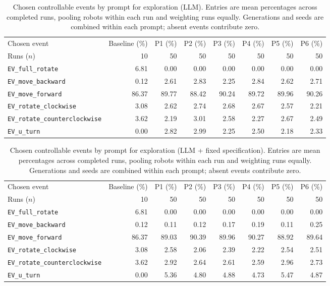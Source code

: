 \begin{table}[htbp]
\centering
\small
\caption{Chosen controllable events by prompt for exploration (LLM). Entries are mean percentages across completed runs, pooling robots within each run and weighting runs equally. Generations and seeds are combined within each prompt; absent events contribute zero.}
\label{tab:exploration-without-fixed-spec-prompt-events}
\begin{tabular}{lrrrrrrr}
\hline
Chosen event & Baseline (\%) & P1 (\%) & P2 (\%) & P3 (\%) & P4 (\%) & P5 (\%) & P6 (\%) \\
Runs ($n$) & 10 & 50 & 50 & 50 & 50 & 50 & 50 \\
\hline
\texttt{EV\_full\_rotate} & 6.81 & 0.00 & 0.00 & 0.00 & 0.00 & 0.00 & 0.00 \\
\texttt{EV\_move\_backward} & 0.12 & 2.61 & 2.83 & 2.25 & 2.84 & 2.62 & 2.71 \\
\texttt{EV\_move\_forward} & 86.37 & 89.77 & 88.42 & 90.24 & 89.72 & 89.96 & 90.26 \\
\texttt{EV\_rotate\_clockwise} & 3.08 & 2.62 & 2.74 & 2.68 & 2.67 & 2.57 & 2.21 \\
\texttt{EV\_rotate\_counterclockwise} & 3.62 & 2.19 & 3.01 & 2.58 & 2.27 & 2.67 & 2.49 \\
\texttt{EV\_u\_turn} & 0.00 & 2.82 & 2.99 & 2.25 & 2.50 & 2.18 & 2.33 \\
\hline
\end{tabular}
\end{table}

\begin{table}[htbp]
\centering
\small
\caption{Chosen controllable events by prompt for exploration (LLM + fixed specification). Entries are mean percentages across completed runs, pooling robots within each run and weighting runs equally. Generations and seeds are combined within each prompt; absent events contribute zero.}
\label{tab:exploration-with-fixed-spec-prompt-events}
\begin{tabular}{lrrrrrrr}
\hline
Chosen event & Baseline (\%) & P1 (\%) & P2 (\%) & P3 (\%) & P4 (\%) & P5 (\%) & P6 (\%) \\
Runs ($n$) & 10 & 50 & 50 & 50 & 50 & 50 & 50 \\
\hline
\texttt{EV\_full\_rotate} & 6.81 & 0.00 & 0.00 & 0.00 & 0.00 & 0.00 & 0.00 \\
\texttt{EV\_move\_backward} & 0.12 & 0.11 & 0.12 & 0.17 & 0.19 & 0.11 & 0.25 \\
\texttt{EV\_move\_forward} & 86.37 & 89.03 & 90.39 & 89.96 & 90.27 & 88.92 & 89.64 \\
\texttt{EV\_rotate\_clockwise} & 3.08 & 2.58 & 2.06 & 2.39 & 2.22 & 2.54 & 2.51 \\
\texttt{EV\_rotate\_counterclockwise} & 3.62 & 2.92 & 2.64 & 2.61 & 2.59 & 2.96 & 2.73 \\
\texttt{EV\_u\_turn} & 0.00 & 5.36 & 4.80 & 4.88 & 4.73 & 5.47 & 4.87 \\
\hline
\end{tabular}
\end{table}
